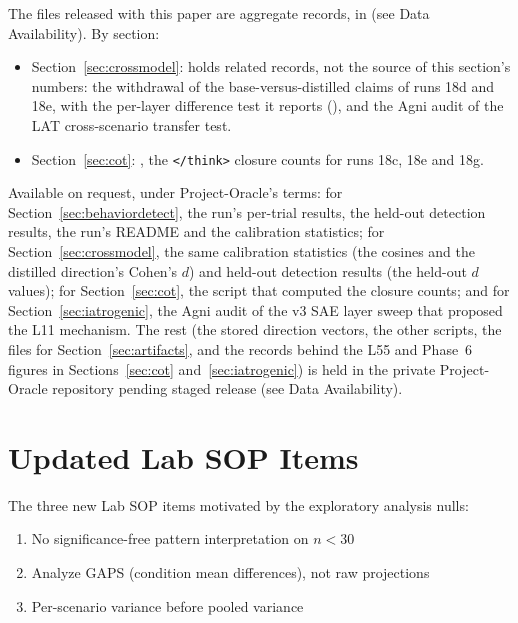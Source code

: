 \documentclass[11pt,letterpaper]{article}
\begin{document}
The files released with this paper are aggregate records, in  (see Data
Availability). By section:
\begin{itemize}
  \item Section~\ref{sec:crossmodel}:  holds related records, not the source of
    this section's numbers: the withdrawal of the base-versus-distilled claims of runs 18d and 18e,
    with the per-layer difference test it reports
    (), and the Agni audit of the LAT
    cross-scenario transfer test.
  \item Section~\ref{sec:cot}: , the \texttt{</think>} closure
    counts for runs 18c, 18e and 18g.
\end{itemize}
Available on request, under Project-Oracle's terms: for Section~\ref{sec:behaviordetect}, the run's
per-trial results, the held-out detection results, the run's README and the calibration statistics;
for Section~\ref{sec:crossmodel}, the same calibration statistics (the cosines and the distilled
direction's Cohen's $d$) and held-out detection results (the held-out $d$ values); for
Section~\ref{sec:cot}, the script that computed the closure counts; and for
Section~\ref{sec:iatrogenic}, the Agni audit of the v3 SAE layer sweep that proposed the L11
mechanism. The rest (the stored direction vectors, the other scripts, the files for Section~\ref{sec:artifacts}, and
the records behind the L55 and Phase~6 figures in Sections~\ref{sec:cot} and~\ref{sec:iatrogenic})
is held in the private Project-Oracle repository pending staged release (see Data Availability).

\section{Updated Lab SOP Items}\label{app:sop}

The three new Lab SOP items motivated by the exploratory analysis nulls:
\begin{enumerate}[label=\arabic*.]
  \item No significance-free pattern interpretation on $n < 30$
  \item Analyze GAPS (condition mean differences), not raw projections
  \item Per-scenario variance before pooled variance
\end{enumerate}
\end{document}
